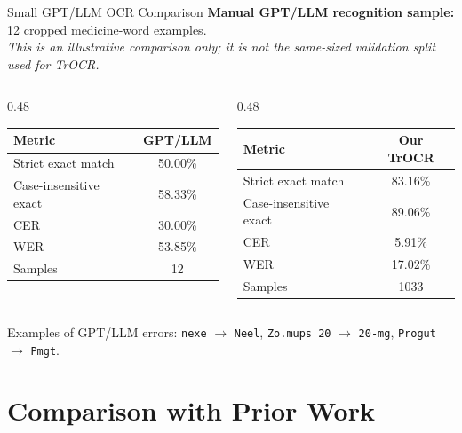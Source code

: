 \documentclass{beamer}
\begin{document}
\begin{frame}{Small GPT/LLM OCR Comparison}
\small
\textbf{Manual GPT/LLM recognition sample:} 12 cropped medicine-word examples.\\
\textit{This is an illustrative comparison only; it is not the same-sized validation split used for TrOCR.}

\vspace{0.25cm}
\begin{columns}
\begin{column}{0.48\textwidth}
\centering
\renewcommand{\arraystretch}{1.2}
\begin{tabular}{l c}
\hline
\textbf{Metric} & \textbf{GPT/LLM} \\
\hline
Strict exact match & 50.00\% \\
Case-insensitive exact & 58.33\% \\
CER & 30.00\% \\
WER & 53.85\% \\
Samples & 12 \\
\hline
\end{tabular}
\end{column}
\begin{column}{0.48\textwidth}
\centering
\renewcommand{\arraystretch}{1.2}
\begin{tabular}{l c}
\hline
\textbf{Metric} & \textbf{Our TrOCR} \\
\hline
Strict exact match & 83.16\% \\
Case-insensitive exact & 89.06\% \\
CER & 5.91\% \\
WER & 17.02\% \\
Samples & 1033 \\
\hline
\end{tabular}
\end{column}
\end{columns}

\vspace{0.25cm}
\footnotesize
Examples of GPT/LLM errors: \texttt{nexe} $\rightarrow$ \texttt{Neel}, \texttt{Zo.mups 20} $\rightarrow$ \texttt{20-mg}, \texttt{Progut} $\rightarrow$ \texttt{Pmgt}.
\end{frame}


\section{Comparison with Prior Work}
\end{document}
